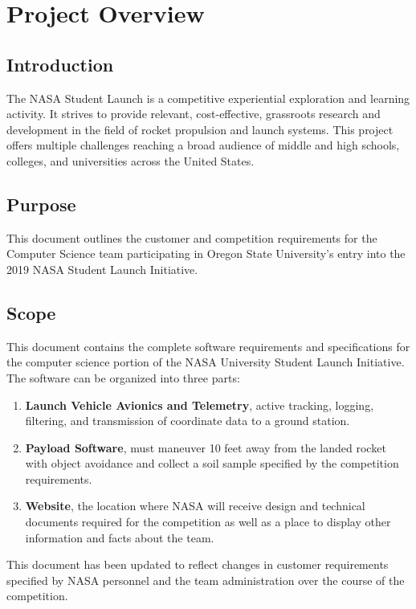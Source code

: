\documentclass[onecolumn, draftclsnofoot, 10pt, compsoc]{IEEEtran}
\begin{document}
\section{Project Overview}
\subsection{Introduction}
The NASA Student Launch is a competitive experiential exploration and learning activity. It strives to provide relevant, cost-effective, grassroots research and development in the field of rocket propulsion and launch systems. This project offers multiple challenges reaching a broad audience of middle and high schools, colleges, and universities across the United States.

\subsection{Purpose}
This document outlines the customer and competition requirements for the Computer Science team participating in Oregon State University's entry into the 2019 NASA Student Launch Initiative. 

\subsection{Scope} %
This document contains the complete software requirements and specifications for the computer science portion of the NASA University Student Launch Initiative.  The software can be organized into three parts:

\begin{enumerate}
\item \textbf{Launch Vehicle Avionics and Telemetry}, active tracking, logging, filtering, and transmission of coordinate data to a ground station.
\item \textbf{Payload Software}, must maneuver 10 feet away from the landed rocket with object avoidance and collect a soil sample specified by the competition requirements.
\item \textbf{Website}, the location where NASA will receive design and technical documents required for the competition as well as a place to display other information and facts about the team.
\end{enumerate}

This document has been updated to reflect changes in customer requirements specified by NASA personnel and the team administration over the course of the competition.
\end{document}
